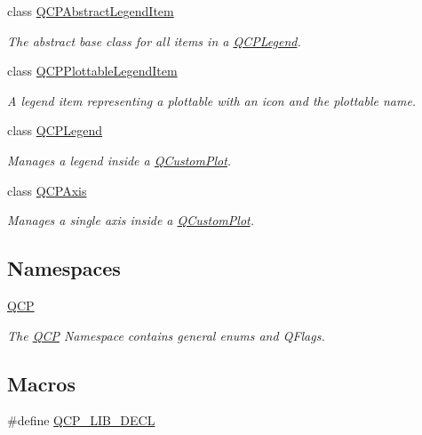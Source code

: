 \begin{DoxyCompactItemize}
class \hyperlink{a00023}{Q\+C\+P\+Abstract\+Legend\+Item}
\begin{DoxyCompactList}\small\item\em The abstract base class for all items in a \hyperlink{a00045}{Q\+C\+P\+Legend}. \end{DoxyCompactList}\item 
class \hyperlink{a00048}{Q\+C\+P\+Plottable\+Legend\+Item}
\begin{DoxyCompactList}\small\item\em A legend item representing a plottable with an icon and the plottable name. \end{DoxyCompactList}\item 
class \hyperlink{a00045}{Q\+C\+P\+Legend}
\begin{DoxyCompactList}\small\item\em Manages a legend inside a \hyperlink{a00030_d8/d00/a00186}{Q\+Custom\+Plot}. \end{DoxyCompactList}\item 
class \hyperlink{a00025}{Q\+C\+P\+Axis}
\begin{DoxyCompactList}\small\item\em Manages a single axis inside a \hyperlink{a00030_d8/d00/a00186}{Q\+Custom\+Plot}. \end{DoxyCompactList}\end{DoxyCompactItemize}
\subsection*{Namespaces}
\begin{DoxyCompactItemize}
\item 
 \hyperlink{a00143}{Q\+C\+P}
\begin{DoxyCompactList}\small\item\em The \hyperlink{a00143}{Q\+C\+P} Namespace contains general enums and Q\+Flags. \end{DoxyCompactList}\end{DoxyCompactItemize}
\subsection*{Macros}
\begin{DoxyCompactItemize}
\item 
\#define \hyperlink{a00116_a5eaab02224a642ded7fb8951e973a02c}{Q\+C\+P\+\_\+\+L\+I\+B\+\_\+\+D\+E\+C\+L}
\end{DoxyCompactItemize}
